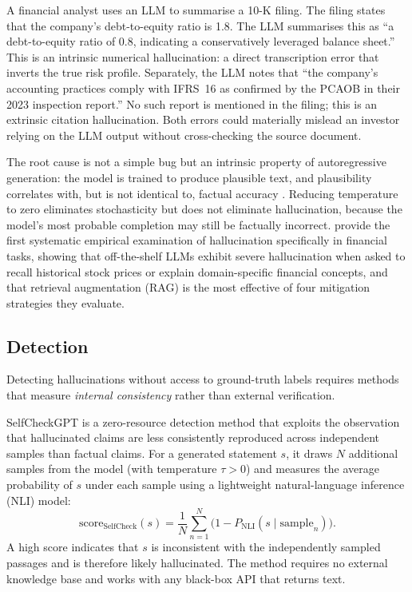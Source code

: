 \begin{context}
\begin{example}
\label{ex:hallucination}
A financial analyst uses an LLM to summarise a 10-K filing.  The filing states that
the company's debt-to-equity ratio is 1.8.  The LLM summarises this as ``a
debt-to-equity ratio of 0.8, indicating a conservatively leveraged balance sheet.''
This is an intrinsic numerical hallucination: a direct transcription error that
inverts the true risk profile.  Separately, the LLM notes that ``the company's
accounting practices comply with IFRS~16 as confirmed by the PCAOB in their 2023
inspection report.''  No such report is mentioned in the filing; this is an extrinsic
citation hallucination.  Both errors could materially mislead an investor relying on
the LLM output without cross-checking the source document.
\end{example}

The root cause is not a simple bug but an intrinsic property of autoregressive
generation: the model is trained to produce plausible text, and plausibility
correlates with, but is not identical to, factual accuracy \citep{ji2023survey}.
Reducing temperature to zero eliminates stochasticity but does not eliminate
hallucination, because the model's most probable completion may still be factually
incorrect.  \citet{kang2023hallucination} provide the first systematic empirical
examination of hallucination specifically in financial tasks, showing that off-the-shelf
LLMs exhibit severe hallucination when asked to recall historical stock prices or
explain domain-specific financial concepts, and that retrieval augmentation (RAG)
is the most effective of four mitigation strategies they evaluate.

\subsection{Detection}
\label{sec:hallucinations-detection}

Detecting hallucinations without access to ground-truth labels requires methods that
measure \emph{internal consistency} rather than external verification.

SelfCheckGPT \citep{manakul2023selfcheckgpt} is a zero-resource detection method
that exploits the observation that hallucinated claims are less consistently reproduced
across independent samples than factual claims.  For a generated statement $s$, it
draws $N$ additional samples from the model (with temperature $\tau > 0$) and measures
the average probability of $s$ under each sample using a lightweight natural-language
inference (NLI) model:
\begin{equation}
  \text{score}_{\text{SelfCheck}}(s)
    = \frac{1}{N} \sum_{n=1}^{N} \bigl(1 - P_{\text{NLI}}(s \mid \text{sample}_n)\bigr).
  \label{eq:selfcheckgpt}
\end{equation}
A high score indicates that $s$ is inconsistent with the independently sampled
passages and is therefore likely hallucinated.  The method requires no external
knowledge base and works with any black-box API that returns text.


\end{context}
